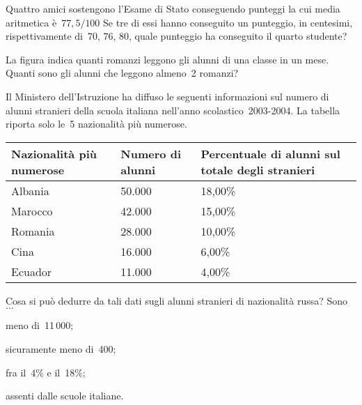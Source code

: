 \begin{multicols}{2}
\begin{esercizio}
\label{ese:A.51}
Quattro amici sostengono l'Esame di Stato conseguendo punteggi la cui media 
aritmetica è~\(77,5/100\)
Se tre di essi hanno conseguito un punteggio, in centesimi, rispettivamente 
di~70, 76, 80, quale punteggio ha conseguito il quarto studente?
\end{esercizio}

\begin{esercizio}
\label{ese:A.57}
La figura indica quanti romanzi leggono gli alunni di una classe in un 
mese. Quanti sono gli alunni che leggono almeno~2 romanzi?

\begin{center}
 
\end{center}
\end{esercizio}
\end{multicols}

\begin{esercizio}
\label{ese:A.58}
Il Ministero dell'Istruzione ha diffuso le seguenti informazioni sul numero 
di alunni stranieri della scuola italiana
nell'anno scolastico~2003-2004. La tabella riporta solo le~5 nazionalità 
più numerose.
\begin{center}
 \begin{tabularx}{.9\textwidth}{*{3}{X}}
\toprule
Nazionalità più numerose & Numero di alunni & Percentuale di alunni sul 
totale degli stranieri \\
\midrule
Albania & 50.000 & 18,00\% \\
Marocco & 42.000 & 15,00\% \\
Romania & 28.000 & 10,00\% \\
Cina & 16.000 & 6,00\% \\
Ecuador & 11.000 & 4,00\% \\
\bottomrule
\end{tabularx}
\end{center}

Cosa si può dedurre da tali dati sugli alunni stranieri di nazionalità 
russa? Sono~\(\ldots\)
\begin{multicols}{2}
\begin{enumeratea}
 \item meno di~11\,000;
 \item sicuramente meno di~400;
 \item fra il~4\% e il~18\%;
 \item assenti dalle scuole italiane.
\end{enumeratea}
\end{multicols}
\end{esercizio}

